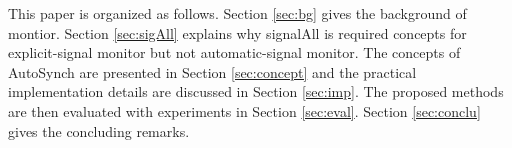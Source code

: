 \documentclass[preprint]{sigplanconf}
\begin{document}

This paper is organized as follows. Section \ref{sec:bg} gives the background
of montior. 
Section \ref{sec:sigAll} explains why signalAll is required concepts for
explicit-signal monitor but not automatic-signal monitor. The concepts of 
AutoSynch are presented in Section \ref{sec:concept} and the practical 
implementation details are discussed in Section  \ref{sec:imp}. The proposed 
methods are then evaluated with experiments in Section \ref{sec:eval}. 
Section \ref{sec:conclu} gives the concluding remarks.
\end{document}
